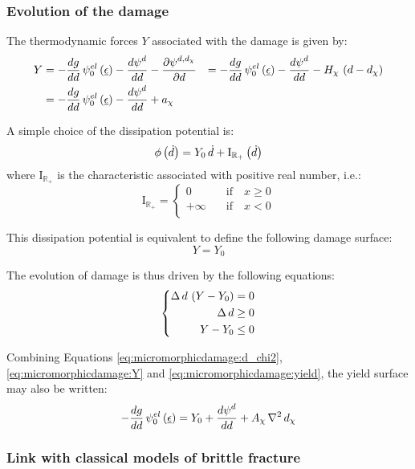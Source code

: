 \subsubsection{Evolution of the damage}

The thermodynamic forces \(Y\) associated with the damage is given by:
\[
\begin{aligned}
Y &= -\displaystyle \frac{\displaystyle dg}{\displaystyle dd}\,{\psi}^{el}_{0}\left(\underline{\epsilon}\right)-\displaystyle \frac{\displaystyle d{\psi}^{d}}{\displaystyle dd}-\displaystyle \frac{\displaystyle \partial {\psi}^{d, d_{\chi}}}{\displaystyle \partial d}
&=-\displaystyle \frac{\displaystyle dg}{\displaystyle dd}\,{\psi}^{el}_{0}\left(\underline{\epsilon}\right)-\displaystyle \frac{\displaystyle d{\psi}^{d}}{\displaystyle dd}-H_{\chi}\,\left(d-d_{\chi}\right)\\
&=-\displaystyle \frac{\displaystyle dg}{\displaystyle dd}\,{\psi}^{el}_{0}\left(\underline{\epsilon}\right)-\displaystyle \frac{\displaystyle d{\psi}^{d}}{\displaystyle dd}+a_{\chi}\\
\end{aligned}
\]\label{eq:micromorphicdamage:Y}

A simple choice of the dissipation potential is:
\[
\phi\left(\dot{d}\right) = Y_{0}\,\dot{d}+ \mathrm{I}_{\mathbb{R}_{+}}\left(\dot{d}\right) 
\]\label{eq:micromorphicdamage:dissipationpotential}
where \(\mathrm{I}_{\mathbb{R}_{+}}\) is the characteristic associated with positive real number, i.e.:
\[
\mathrm{I}_{\mathbb{R}_{+}}=
\left\{
\begin{aligned}
0 &\quad\text{if}\quad x\geq 0 \\
+\infty &\quad\text{if}\quad x< 0 \\
\end{aligned}
\right.
\]

This dissipation potential is equivalent to define the following damage surface:
\[
Y = Y_{0}
\]\label{eq:micromorphicdamage:yield}

The evolution of damage is thus driven by the following equations:
\[
\left\{
\begin{aligned}
\Delta\,d\,\left(Y - Y_{0}\right)&=0\\
\Delta\,d&\geq 0\\
Y - Y_{0}&\leq 0
\end{aligned}
\right.
\]\label{eq:micromorphicdamage:KTT}

Combining Equations \eqref{eq:micromorphicdamage:d_chi2},
\eqref{eq:micromorphicdamage:Y} and \eqref{eq:micromorphicdamage:yield}, the yield
surface may also be written:
\[
-\displaystyle \frac{\displaystyle dg}{\displaystyle dd}\,{\psi}^{el}_{0}\left(\underline{\epsilon}\right)=
Y_{0}+\displaystyle \frac{\displaystyle d{\psi}^{d}}{\displaystyle dd}+A_{\chi}\,\nabla{}^2\,d_{\chi}
\]

\subsubsection{Link with classical models of brittle fracture}

